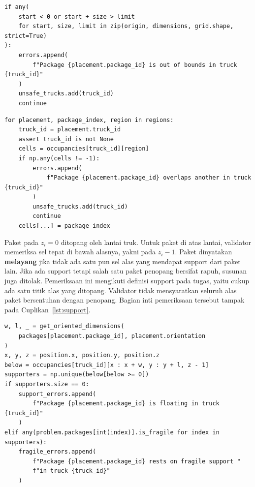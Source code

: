 \documentclass[12pt,a4paper]{article}
\begin{document}
\begin{lstlisting}[emph={any,errors,unsafe_trucks},caption={Pemeriksaan batas peti kemas},label={lst:boundary}]
if any(
    start < 0 or start + size > limit
    for start, size, limit in zip(origin, dimensions, grid.shape, strict=True)
):
    errors.append(
        f"Package {placement.package_id} is out of bounds in truck {truck_id}"
    )
    unsafe_trucks.add(truck_id)
    continue
\end{lstlisting}
\begin{lstlisting}[emph={np,any,errors,unsafe_trucks},caption={Pemeriksaan overlap pada occupancy grid},label={lst:overlap}]
for placement, package_index, region in regions:
    truck_id = placement.truck_id
    assert truck_id is not None
    cells = occupancies[truck_id][region]
    if np.any(cells != -1):
        errors.append(
            f"Package {placement.package_id} overlaps another in truck {truck_id}"
        )
        unsafe_trucks.add(truck_id)
        continue
    cells[...] = package_index
\end{lstlisting}

Paket pada $z_i=0$ ditopang oleh lantai truk. Untuk paket di atas lantai, validator memeriksa sel tepat di bawah alasnya, yakni pada $z_i-1$. Paket dinyatakan \textbf{melayang} jika tidak ada satu pun sel alas yang mendapat support dari paket lain. Jika ada support tetapi salah satu paket penopang bersifat rapuh, susunan juga ditolak. Pemeriksaan ini mengikuti definisi support pada tugas, yaitu cukup ada satu titik alas yang ditopang. Validator tidak mensyaratkan seluruh alas paket bersentuhan dengan penopang. Bagian inti pemeriksaan tersebut tampak pada Cuplikan~\ref{lst:support}.

\begin{lstlisting}[emph={supporters,unique,any,is_fragile},caption={Pemeriksaan support dan paket rapuh},label={lst:support}]
w, l, _ = get_oriented_dimensions(
    packages[placement.package_id], placement.orientation
)
x, y, z = position.x, position.y, position.z
below = occupancies[truck_id][x : x + w, y : y + l, z - 1]
supporters = np.unique(below[below >= 0])
if supporters.size == 0:
    support_errors.append(
        f"Package {placement.package_id} is floating in truck {truck_id}"
    )
elif any(problem.packages[int(index)].is_fragile for index in supporters):
    fragile_errors.append(
        f"Package {placement.package_id} rests on fragile support "
        f"in truck {truck_id}"
    )
\end{lstlisting}
\end{document}
